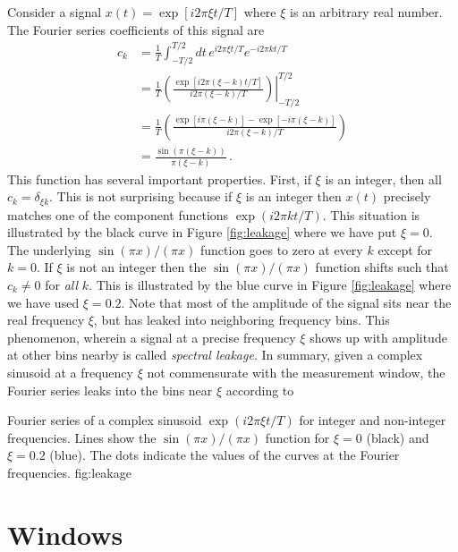 \documentclass[twocolumn]{article}
\begin{document}
Consider a signal $x(t) = \exp[i 2 \pi \xi t / T]$ where $\xi$ is an arbitrary real number.
The Fourier series coefficients of this signal are
\begin{align}
c_k
&= \frac{1}{T} \int_{-T/2}^{T/2} dt \, e^{i 2 \pi \xi t / T} e^{-i 2 \pi k t / T} \nonumber \\
&= \frac{1}{T} \left. \left( \frac{\exp\left[i 2 \pi (\xi - k) t / T \right]}{i 2 \pi (\xi - k) / T} \right) \right|_{-T/2}^{T/2} \nonumber \\
&= \frac{1}{T} \left( \frac{\exp\left[i \pi (\xi - k) \right] - \exp\left[-i \pi (\xi - k) \right]}{i 2 \pi (\xi - k) / T} \right) \nonumber \\
&= \frac{\sin \left(\pi (\xi - k) \right)}{\pi (\xi - k)} \, .
\end{align}
This function has several important properties.
First, if $\xi$ is an integer, then all $c_k = \delta_{\xi k}$.
This is not surprising because if $\xi$ is an integer then $x(t)$ precisely matches one of the component functions $\exp\left(i 2 \pi k t / T \right)$.
This situation is illustrated by the black curve in Figure \ref{fig:leakage} where we have put $\xi=0$.
The underlying $\sin(\pi x)/(\pi x)$ function goes to zero at every $k$ except for $k=0$.
If $\xi$ is not an integer then the $\sin(\pi x) / (\pi x)$ function shifts such that $c_k \neq 0$ for \emph{all} $k$.
This is illustrated by the blue curve in Figure \ref{fig:leakage} where we have used $\xi = 0.2$.
Note that most of the amplitude of the signal sits near the real frequency $\xi$, but has leaked into neighboring frequency bins.
This phenomenon, wherein a signal at a precise frequency $\xi$ shows up with amplitude at other bins nearby is called \emph{spectral leakage}.
In summary, given a complex sinusoid at a frequency $\xi$ not commensurate with the measurement window, the Fourier series leaks into the bins near $\xi$ according to

{Fourier series of a complex sinusoid $\exp\left(i 2 \pi \xi t / T\right)$ for integer and non-integer frequencies. Lines show the $\sin(\pi x) / (\pi x)$ function for $\xi=0$ (black) and $\xi=0.2$ (blue). The dots indicate the values of the curves at the Fourier frequencies.}
{fig:leakage}


\section{Windows}
\end{document}
